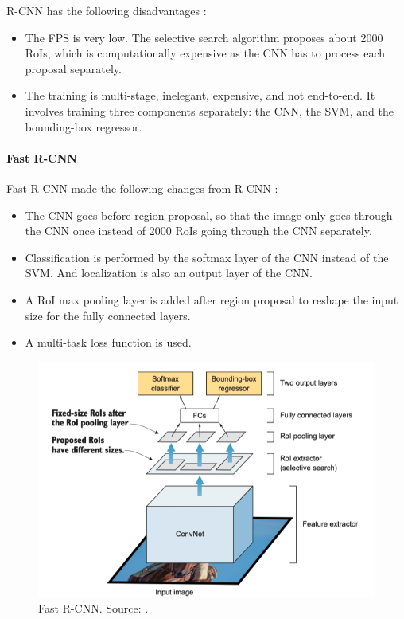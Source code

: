 \documentclass[a4paper, 11pt, oneside]{article}
\begin{document}
R-CNN has the following disadvantages \cite{elgendy2020deep, girshick2014rich, girshick2015fast}:

\begin{itemize}
  \item The FPS is very low. The selective search algorithm proposes about 2000 RoIs, which is computationally
  expensive as the CNN has to process each proposal separately.
  \item The training is multi-stage, inelegant, expensive, and not end-to-end. It involves training three components
  separately: the CNN, the SVM, and the bounding-box regressor.
\end{itemize}

\paragraph{Fast R-CNN}

Fast R-CNN made the following changes from R-CNN \cite{elgendy2020deep, girshick2015fast}:

\begin{itemize}
  \item The CNN goes before region proposal, so that the image only goes through the CNN once instead
  of 2000 RoIs going through the CNN separately.
  \item Classification is performed by the softmax layer of the CNN instead of the SVM. And localization is also an output
  layer of the CNN.
  \item A RoI max pooling layer is added after region proposal to reshape the input size for the fully connected layers.
  \item A multi-task loss function is used.
\end{itemize}

\begin{figure}[ht]
  \begin{center}
    \includegraphics[width=.8\textwidth]{fast_r_cnn.png}
  \end{center}
  \caption{Fast R-CNN. Source: \cite{elgendy2020deep}.}
\end{figure}
\end{document}

